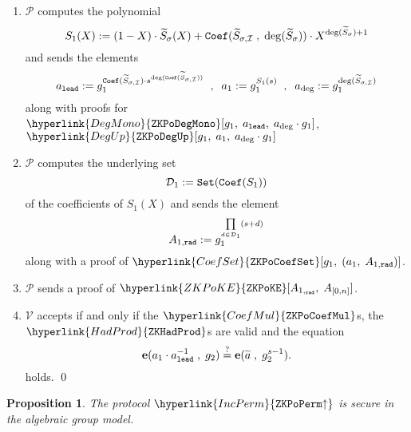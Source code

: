 \documentclass[11pt, lettersize, notitlepage, leqno, footskip=0.6cm]{article}
\newcommand{\wti}{\widetilde}
\newcommand{\mc}{\mathcal}
\newcommand{\mbf}{\mathbf}
\newcommand{\mP}{\mc{P}}
\newcommand{\V}{\mc{V}}
\newcommand{\vs}{\vspace{-0.15cm}}
\newcommand{\sta}{\stackrel{?}{=}}
\newcommand{\e}{\mbf{e}}
\newtheorem{Prop}[Thm]{Proposition}
\numberwithin{equation}{section}
\begin{document}
\begin{mdframed}
\begin{enumerate}[wide, labelwidth=!, labelindent=0pt, itemsep=-0.2ex]


\item $\mP$ computes the polynomial \vs $${S}_{1}(X):= (1-X)\cdot \wti{S}_{\sigma}(X) + {\tt{Coef}}(\wti{S}_{\sigma,\mc{I}}\;,\;\deg(\wti{S}_{\sigma})) \cdot X^{\deg(\wti{S}_{\sigma})+1} $$ and sends the elements \vs $$a_{\tt{lead}}:= g_1^{{\tt{Coef}}(\wti{S}_{\sigma,\mc{I}})\cdot s^{\deg({\tt{Coef}}(\wti{S}_{\sigma,\mc{I}}))}}\;\;,\;\; a_1:= g_1^{S_{1}(s)} \;\;,\;\; a_{\deg}:= g_1^{\deg(\wti{S}_{\sigma,\mc{I}})} $$ along with proofs for $\hyperlink{DegMono}{\tt{ZKPoDegMono}}[g_1,\;a_{\tt{lead}},\; a_{\deg}\cdot g_1]$, $\hyperlink{DegUp}{\tt{ZKPoDegUp}}[g_1,\;a_1,\; a_{\deg}\cdot g_1]$



\item $\mP$ computes the underlying set \vs $$\mc{D}_1:= {\tt{Set}}({\tt{Coef}}(S_1))$$ of the coefficients of $S_1(X)$ and sends the element \vs $$ A_{1,\tt{rad}}:= g_1^{\prod\limits_{d\in \mc{D}_1} (s+d)} $$ along with a proof of $\hyperlink{CoefSet}{\tt{ZKPoCoefSet}}[g_1,\;(a_1,\;A_{1,\tt{rad}})]$.

\item $\mP$ sends a proof of $\hyperlink{ZKPoKE}{\tt{ZKPoKE}}[A_{1,_{\tt{rad}}},\; A_{[0,n]}]$.

\item $\V$ accepts if and only if the $\hyperlink{CoefMul}{\tt{ZKPoCoefMul}}$s, the $\hyperlink{HadProd}{\tt{ZKHadProd}}$s are valid and the equation \vs $$ \e(a_1\cdot a_{\tt{lead}}^{-1}\;,\;g_2) \sta \e(\wti{a}\;,\;g_2^{s-1}). \vs $$ holds. \qed \end{enumerate} \end{mdframed} 


\bigskip

\begin{Prop} The protocol $\hyperlink{IncPerm}{\tt{ZKPoPerm\hspace{-1mm}\uparrow}}$ is secure in the algebraic group model. \end{Prop}
\end{document}
